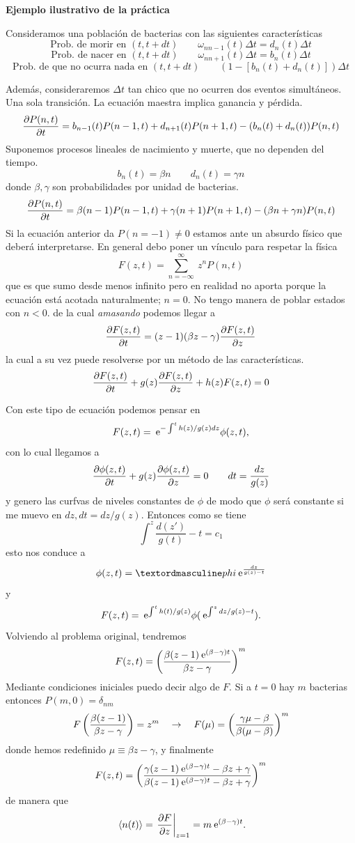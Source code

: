 \documentclass[10pt,oneside]{CBFT_book}
\begin{document}
\begin{ejemplo}{\bf Ejemplo ilustrativo de la práctica}

Consideramos una población de bacterias con las siguientes características
\[
	\text{Prob. de morir en } (t,t+dt) \qquad \omega_{n n-1}(t)\Delta t = d_n(t)\Delta t
\]
\[
	\text{Prob. de nacer en } (t,t+dt) \qquad \omega_{n n+1}(t)\Delta t = b_n(t)\Delta t
\]
\[
	\text{Prob. de que no ocurra nada en } (t,t+dt) \qquad ( 1 - [ b_{n}(t) + d_n (t) ] ) \Delta t 
\]

Además, consideraremos $\Delta t$ tan chico que no ocurren dos eventos simultáneos. Una sola
transición. La ecuación maestra implica ganancia y pérdida.
\[
	\frac{\partial^{\hspace{-0.05em}} {P(n,t)}}{\partial {t}^{\hspace{-0.05em}}} = b_{n-1}(t) P(n-1,t) +
	d_{n+1}(t) P(n+1,t) - ( b_{n}(t) + d_{n}(t) ) P(n,t)
\]
Suponemos procesos lineales de nacimiento y muerte, que no dependen del tiempo.
\[
	b_n(t) = \beta n \qquad d_n(t) = \gamma n
\]
donde $\beta,\gamma$ son probabilidades por unidad de bacterias.
\[
	\frac{\partial^{\hspace{-0.05em}} {P(n,t)}}{\partial {t}^{\hspace{-0.05em}}} = \beta (n-1) P(n-1,t) +
	\gamma (n+1) P(n+1,t) - (\beta n + \gamma n ) P(n,t)
\]
Si la ecuación anterior da $P(n=-1) \neq 0$ estamos ante un absurdo físico que deberá interpretarse.
En general debo poner un vínculo para respetar la física
\[
	F(z,t) = \sum_{n=-\infty}^\infty \: z^n P(n,t)
\]
que es que sumo desde menos infinito pero en realidad no aporta porque la ecuación está acotada 
naturalmente; $n=0$. No tengo manera de poblar estados con $n < 0$.
de la cual {\it amasando} podemos llegar a
\[
	\frac{\partial^{\hspace{-0.05em}} {F(z,t)}}{\partial {t}^{\hspace{-0.05em}}} = (z-1)(\beta z - \gamma) \frac{\partial^{\hspace{-0.05em}} {F(z,t)}}{\partial {z}^{\hspace{-0.05em}}}
\]
la cual a su vez puede resolverse por un método de las características.
\[
	\frac{\partial^{\hspace{-0.05em}} {F(z,t)}}{\partial {t}^{\hspace{-0.05em}}} + g(z) \frac{\partial^{\hspace{-0.05em}} {F(z,t)}}{\partial {z}^{\hspace{-0.05em}}} + h(z) F(z,t) = 0
\]

Con este tipo de ecuación podemos pensar en
\[
	F(z,t) = \:\mathrm{e}^{-\int^t h(z)/g(z) dz} \phi( z, t),
\]
con lo cual llegamos a
\[
	\frac{\partial^{\hspace{-0.05em}} {\phi(z,t)}}{\partial {t}^{\hspace{-0.05em}}} + g(z) \frac{\partial^{\hspace{-0.05em}} {\phi(z,t)}}{\partial {z}^{\hspace{-0.05em}}} = 0 
	\qquad dt = \frac{dz}{g(z)}
\]
y genero las curfvas de niveles constantes de $ \phi $ de modo que $\phi$ será constante si me muevo
en $dz, dt= dz/g(z)$.
Entonces como se tiene
\[
	\int^z \frac{d(z')}{g(t)} - t = c_1
\]
esto nos conduce a 
\[
	\phi(z,t) = ºphi \euler^{ \frac{dz}{g(z)-t}}
\]
y
\[
	F(z,t) = \:\mathrm{e}^{\int^t h(t)/g(z)} \phi( \:\mathrm{e}^{\int^z dz/g(z) -t}).
\]
Volviendo al problema original, tendremos
\[
	F(z,t) = \left( \frac{  \beta(z-1) \:\mathrm{e}^{(\beta - \gamma)t}  }{ \beta z - \gamma } \right)^m
\]
Mediante condiciones iniciales puedo decir algo de $F$.
Si a $t=0$ hay $m$ bacterias entonces $P(m,0) = \delta_{nm}$
\[
	F\left( \frac{ \beta(z-1) }{ \beta z - \gamma } \right) = z^m \quad \to \quad 
	F(\mu) = \left( \frac{ \gamma \mu - \beta }{ \beta(\mu -\beta) } \right)^m
\]
donde hemos redefinido $\mu \equiv \beta z - \gamma$, y finalmente
\[
	F(z,t) = \left( \frac{  \gamma(z-1) \:\mathrm{e}^{(\beta - \gamma)t} - \beta z + \gamma  }{ \beta(z-1) \:\mathrm{e}^{(\beta - \gamma)t} - \beta z + \gamma } \right)^m
\]
de manera que
\[
	\:\left\langle n(t) \right\rangle = \left.\frac{\partial^{\hspace{-0.05em}} {F}}{\partial {z}^{\hspace{-0.05em}}}\right|_{z=1} = m \:\mathrm{e}^{(\beta-\gamma)t}.
\]
 
\end{ejemplo}


\end{document}
